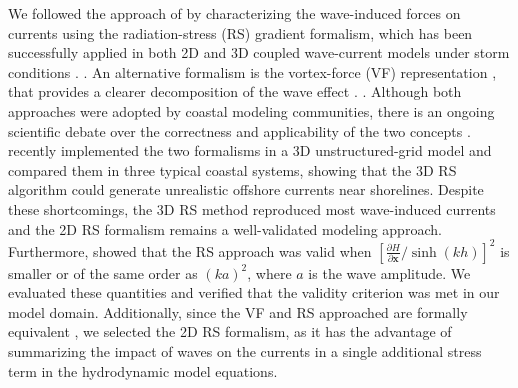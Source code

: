 We followed the approach of \cite{dietrich2012performance} by characterizing the wave-induced forces on currents using the radiation-stress (RS) gradient formalism, which has been successfully applied in both 2D and 3D coupled wave-current models under storm conditions \citep{hope2013hindcast, sebastian2014characterizing, brown2013depth}. . An alternative formalism is the vortex-force (VF) representation \citep{mcwilliams2004asymptotic}, that provides a clearer decomposition of the wave effect \citep{lane2007wave}. . Although both approaches were adopted by coastal modeling communities, there is an ongoing scientific debate over the correctness and applicability of the two concepts \citep{ardhuin2008comments, mellor2013waves, mellor2015combined, ardhuin2017comments}. \cite{xia2020implementation} recently implemented the two formalisms in a 3D unstructured-grid model and compared them in three typical coastal systems, showing that the 3D RS algorithm could generate unrealistic offshore currents near shorelines. Despite these shortcomings, the 3D RS method reproduced most wave-induced currents and the 2D RS formalism remains a well-validated modeling approach. Furthermore, \cite{mellor2013waves} showed that the RS approach was valid when $[\frac{\partial H}{\partial\mathbf{x}}/\sinh(kh)]^2$ is smaller or of the same order as $(ka)^2$, where $a$ is the wave amplitude. We evaluated these quantities and verified that the validity criterion was met in our model domain. Additionally, since the VF and RS approached are formally equivalent \citep{lane2007wave}, we selected the 2D RS formalism, as it has the advantage of summarizing the impact of waves on the currents in a single additional stress term in the hydrodynamic model equations.

